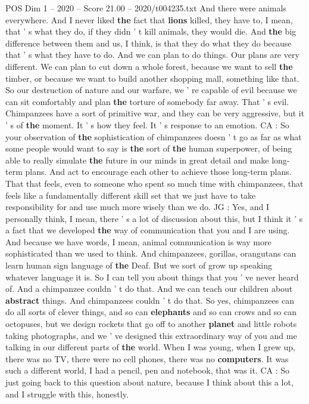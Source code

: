 \begin{textsample}{POS Dim 1 – 2020 – Score 21.00 – 2020/t004235.txt}
And there were animals everywhere.
And I never liked \textbf{the} fact that \textbf{lions} killed, they have to, I mean, that ' s what they do, if they didn ' t kill animals, they would die.
And \textbf{the} big difference between them and us, I think, is that they do what they do because that ' s what they have to do.
And we can plan to do things.
Our plans are very different.
We can plan to cut down a whole forest, because we want to sell \textbf{the} timber, or because we want to build another shopping mall, something like that.
So our destruction of nature and our warfare, we ' re capable of evil because we can sit comfortably and plan \textbf{the} torture of somebody far away.
That ' s evil.
Chimpanzees have a sort of primitive war, and they can be very aggressive, but it ' s of \textbf{the} moment.
It ' s how they feel.
It ' s response to an emotion.
CA : So your observation of \textbf{the} sophistication of chimpanzees doesn ' t go as far as what some people would want to say is \textbf{the} sort of \textbf{the} human superpower, of being able to really simulate \textbf{the} future in our minds in great detail and make long-term plans.
And act to encourage each other to achieve those long-term plans.
That that feels, even to someone who spent so much time with chimpanzees, that feels like a fundamentally different skill set that we just have to take responsibility for and use much more wisely than we do.
JG : Yes, and I personally think, I mean, there ' s a lot of discussion about this, but I think it ' s a fact that we developed \textbf{the} way of communication that you and I are using.
And because we have words, I mean, animal communication is way more sophisticated than we used to think.
And chimpanzees, gorillas, orangutans can learn human sign language of \textbf{the} Deaf.
But we sort of grow up speaking whatever language it is.
So I can tell you about things that you ' ve never heard of.
And a chimpanzee couldn ' t do that.
And we can teach our children about \textbf{abstract} things.
And chimpanzees couldn ' t do that.
So yes, chimpanzees can do all sorts of clever things, and so can \textbf{elephants} and so can crows and so can octopuses, but we design rockets that go off to another \textbf{planet} and little robots taking photographs, and we ' ve designed this extraordinary way of you and me talking in our different parts of \textbf{the} world.
When I was young, when I grew up, there was no TV, there were no cell phones, there was no \textbf{computers}.
It was such a different world, I had a pencil, pen and notebook, that was it.
CA : So just going back to this question about nature, because I think about this a lot, and I struggle with this, honestly.

\end{textsample}
